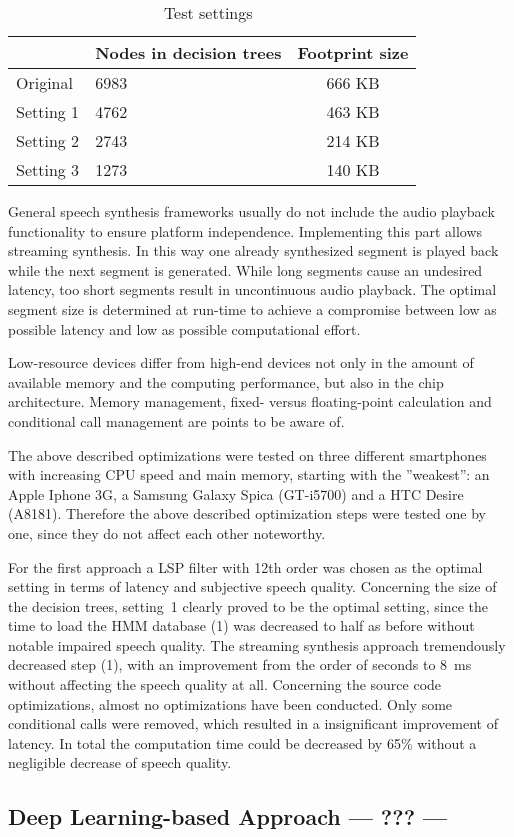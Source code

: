 \begin{table}[h]
	\caption{Test settings~\cite{toth:optimizing}}
	\vspace{-0.75em}
	\label{tab:settings}
	\begin{tabularx}{1\columnwidth}{lYc}
		\toprule
		\textbf{} & \textbf{Nodes in decision trees} & \textbf{Footprint size}\\
		\midrule
		Original & 6983 & 666 KB\\[0.5em]
		Setting 1 & 4762 & 463 KB\\[0.5em]
		Setting 2 & 2743 & 214 KB\\[0.5em]
		Setting 3 & 1273 & 140 KB\\
		\bottomrule
	\end{tabularx}
\end{table}

General speech synthesis frameworks usually do not include the audio playback functionality to ensure platform independence. Implementing this part allows streaming synthesis. In this way one already synthesized segment is played back while the next segment is generated. While long segments cause an undesired latency, too short segments result in uncontinuous audio playback. The optimal segment size is determined at run-time to achieve a compromise between low as possible latency and low as possible computational effort.

Low-resource devices differ from high-end devices not only in the amount of available memory and the computing performance, but also in the chip architecture. Memory management, fixed- versus floating-point calculation and conditional call management are points to be aware of.

The above described optimizations were tested on three different smartphones with increasing CPU speed and main memory, starting with the ''weakest'': an Apple Iphone 3G, a Samsung Galaxy Spica (GT-i5700) and a HTC Desire (A8181). Therefore the above described optimization steps were tested one by one, since they do not affect each other noteworthy.

For the first approach a \ac{LSP} filter with 12th order was chosen as the optimal setting in terms of latency and subjective speech quality. Concerning the size of the decision trees, setting~1 clearly proved to be the optimal setting, since the time to load the \ac{HMM} database (1) was decreased to half as before without notable impaired speech quality. The streaming synthesis approach tremendously decreased step (1), with an improvement from the order of seconds to 8~ms without affecting the speech quality at all. Concerning the source code optimizations, almost no optimizations have been conducted. Only some conditional calls were removed, which resulted in a insignificant improvement of latency. In total the computation time could be decreased by 65\% without a negligible decrease of speech quality.

\subsection{Deep Learning-based Approach {\color{ACMRed}--- ??? ---}}
\label{subsec:deepembedded}

